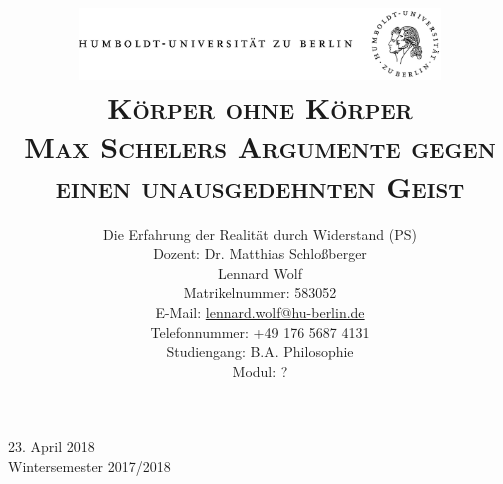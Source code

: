 \documentclass[a4paper, 12pt]{article}
\date{\vspace{-3ex}}
\begin{document}
\title{\vspace{5ex}
	\includegraphics*[bb=0 0 720 200, width=0.72\textwidth]{ErstesSem/images/hu_logo.png}\\
	\vspace{30pt}
	\scshape\LARGE{Körper ohne Körper
}\\\vspace{5pt}\Large{Max Schelers Argumente gegen einen unausgedehnten Geist}\\\vspace{20pt}}
	


\author{Die Erfahrung der Realität durch Widerstand (PS)\\
	\vspace{7pt}
          Dozent: Dr. Matthias Schloßberger\\\vspace{4pt}Lennard Wolf\\
        \small{Matrikelnummer: 583052}\\
        \small{E-Mail: \href{mailto:lennard.wolf@hu-berlin.de}{lennard.wolf@hu-berlin.de}}\\
        \small{Telefonnummer: +49 176 5687 4131}\\
        \small{Studiengang: B.A. Philosophie}\\
        \small{Modul: ?}}

\maketitle

\vspace{\fill}

\begin{minipage}[]{0.92\textwidth}
    \centering
    \onehalfspacing
    \large   
    23. April 2018\\
    Wintersemester 2017/2018

    \vspace{-20mm} 
\end{minipage}%
\thispagestyle{empty}
\newpage
\setcounter{page}{1}
\end{document}
